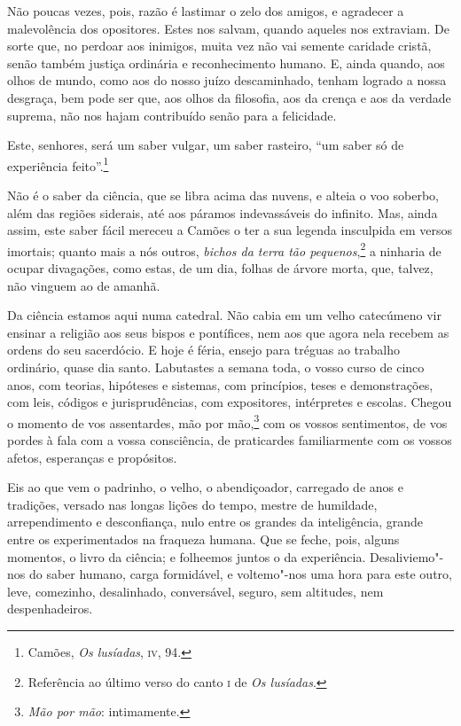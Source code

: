 Não poucas vezes, pois, razão é lastimar o zelo dos amigos, e
agradecer a malevolência dos opositores. Estes nos salvam, quando
aqueles nos extraviam. De sorte que, no perdoar aos inimigos, muita vez
não vai semente caridade cristã, senão também justiça ordinária e
reconhecimento humano. E, ainda quando, aos olhos de mundo, como aos do
nosso juízo descaminhado, tenham logrado a nossa desgraça, bem pode ser
que, aos olhos da filosofia, aos da crença e aos da verdade suprema,
não nos hajam contribuído senão para a felicidade.

Este, senhores, será um saber vulgar, um saber rasteiro,
``um saber só de experiência feito''.\footnote{ Camões,
\textit{Os lusíadas}, \textsc{iv}, 94.}


Não é o saber da ciência, que se libra acima das nuvens, e alteia
o voo soberbo, além das regiões siderais, até aos páramos indevassáveis
do infinito. Mas, ainda assim, este saber fácil mereceu a
Camões o ter a sua legenda insculpida
em versos imortais; quanto mais a nós outros, \textit{bichos da terra
tão pequenos},\footnote{Referência ao último verso do canto \textsc{i} de
\textit{Os lusíadas}.} a ninharia de ocupar divagações, como estas, de um
dia, folhas de árvore morta, que, talvez, não vinguem ao de amanhã.

Da ciência estamos aqui numa catedral. Não cabia em um velho
catecúmeno vir ensinar a religião aos seus bispos e pontífices, nem aos
que agora nela recebem as ordens do seu sacerdócio. E hoje é féria,
ensejo para tréguas ao trabalho ordinário, quase dia santo. Labutastes
a semana toda, o vosso curso de cinco anos, com teorias, hipóteses e
sistemas, com princípios, teses e demonstrações, com leis, códigos e
jurisprudências, com expositores, intérpretes e escolas. Chegou o
momento de vos assentardes, mão por mão,\footnote{ \textit{Mão por mão}: 
intimamente.} com os vossos sentimentos, de vos
pordes à fala com a vossa consciência, de praticardes familiarmente com
os vossos afetos, esperanças e propósitos.

Eis ao que vem o padrinho, o velho, o abendiçoador, carregado de
anos e tradições, versado nas longas lições do tempo, mestre de
humildade, arrependimento e desconfiança, nulo entre os grandes da
inteligência, grande entre os experimentados na fraqueza humana. Que se
feche, pois, alguns momentos, o livro da ciência; e folheemos juntos o
da experiência. Desaliviemo"-nos do saber humano, carga formidável, e
voltemo"-nos uma hora para este outro, leve, comezinho, desalinhado,
conversável, seguro, sem altitudes, nem despenhadeiros.

